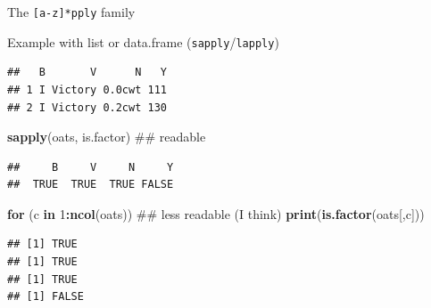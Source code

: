 \documentclass[10pt,ignorenonframetext,]{beamer}
\newenvironment{Shaded}{\begin{snugshade}}{\end{snugshade}}
\newcommand{\KeywordTok}[1]{\textcolor[rgb]{0.13,0.29,0.53}{\textbf{#1}}}
\newcommand{\DecValTok}[1]{\textcolor[rgb]{0.00,0.00,0.81}{#1}}
\newcommand{\ControlFlowTok}[1]{\textcolor[rgb]{0.13,0.29,0.53}{\textbf{#1}}}
\newcommand{\OperatorTok}[1]{\textcolor[rgb]{0.81,0.36,0.00}{\textbf{#1}}}
\newcommand{\NormalTok}[1]{#1}
\begin{document}
\begin{frame}{The \texttt{{[}a-z{]}*pply}
family}
\begin{block}{Example with list or data.frame
(\texttt{sapply}/\texttt{lapply})}
\begin{verbatim}##   B       V      N   Y
## 1 I Victory 0.0cwt 111
## 2 I Victory 0.2cwt 130
\end{verbatim}

\begin{Shaded}
\begin{Highlighting}[]
\KeywordTok{sapply}\NormalTok{(oats, is.factor) ## readable}
\end{Highlighting}
\end{Shaded}

\color{gray}

\begin{verbatim}##     B     V     N     Y 
##  TRUE  TRUE  TRUE FALSE
\end{verbatim}

\begin{Shaded}
\begin{Highlighting}[]
\ControlFlowTok{for}\NormalTok{ (c }\ControlFlowTok{in} \DecValTok{1}\OperatorTok{:}\KeywordTok{ncol}\NormalTok{(oats)) ## less readable (I think)}
    \KeywordTok{print}\NormalTok{(}\KeywordTok{is.factor}\NormalTok{(oats[,c]))}
\end{Highlighting}
\end{Shaded}

\color{gray}

\begin{verbatim}## [1] TRUE
## [1] TRUE
## [1] TRUE
## [1] FALSE
\end{verbatim}

\normalsize

\end{block}

\end{frame}
\end{document}
